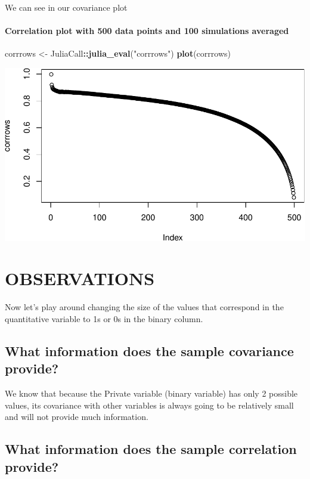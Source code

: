 \documentclass[]{article}
\newenvironment{Shaded}{\begin{snugshade}}{\end{snugshade}}
\newcommand{\KeywordTok}[1]{\textcolor[rgb]{0.13,0.29,0.53}{\textbf{#1}}}
\newcommand{\NormalTok}[1]{#1}
\newcommand{\OperatorTok}[1]{\textcolor[rgb]{0.81,0.36,0.00}{\textbf{#1}}}
\newcommand{\StringTok}[1]{\textcolor[rgb]{0.31,0.60,0.02}{#1}}
\let\oldparagraph\paragraph
\renewcommand{\paragraph}[1]{\oldparagraph{#1}\mbox{}}
\begin{document}
We can see in our covariance plot

\hypertarget{correlation-plot-with-500-data-points-and-100-simulations-averaged}{%
\paragraph{Correlation plot with 500 data points and 100 simulations
averaged}\label{correlation-plot-with-500-data-points-and-100-simulations-averaged}}

\begin{Shaded}
\begin{Highlighting}[]
\NormalTok{corrrows <-}\StringTok{ }\NormalTok{JuliaCall}\OperatorTok{::}\KeywordTok{julia_eval}\NormalTok{(}\StringTok{"corrrows"}\NormalTok{)}
\KeywordTok{plot}\NormalTok{(corrrows)}
\end{Highlighting}
\end{Shaded}

\includegraphics{./figures/unnamed-chunk-11-1.pdf}

\hypertarget{observations}{%
\section{OBSERVATIONS}\label{observations}}

Now let's play around changing the size of the values that correspond in
the quantitative variable to 1s or 0s in the binary column.

\hypertarget{what-information-does-the-sample-covariance-provide}{%
\subsection{What information does the sample covariance
provide?}\label{what-information-does-the-sample-covariance-provide}}

We know that because the Private variable (binary variable) has only 2
possible values, its covariance with other variables is always going to
be relatively small and will not provide much information.

\newpage

\hypertarget{what-information-does-the-sample-correlation-provide}{%
\subsection{What information does the sample correlation
provide?}\label{what-information-does-the-sample-correlation-provide}}
\end{document}
